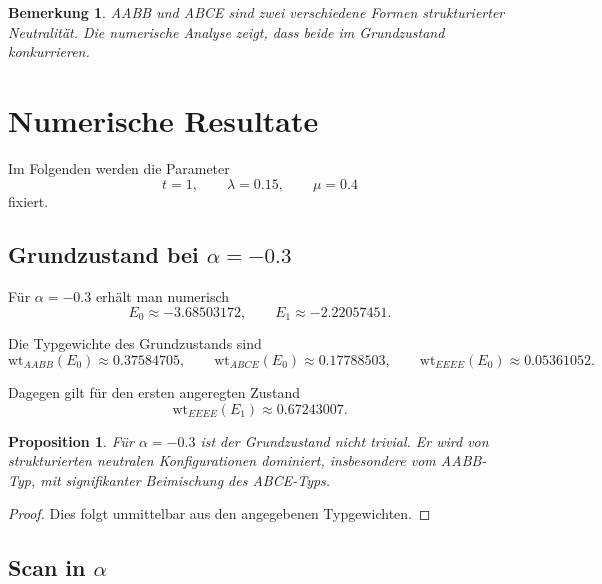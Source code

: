 \documentclass[11pt,a4paper]{article}
\newtheorem{proposition}[definition]{Proposition}
\newtheorem{remark}[definition]{Bemerkung}
\newcommand{\wt}{\mathrm{wt}}
\begin{document}
	\begin{remark}
		AABB und ABCE sind zwei verschiedene Formen strukturierter Neutralität. Die numerische Analyse zeigt, dass beide im Grundzustand konkurrieren.
	\end{remark}
	
	\section{Numerische Resultate}
	
	Im Folgenden werden die Parameter
	\[
	t=1,\qquad \lambda=0.15,\qquad \mu=0.4
	\]
	fixiert.
	
	\subsection{Grundzustand bei \texorpdfstring{$\alpha=-0.3$}{alpha=-0.3}}
	
	Für \(\alpha=-0.3\) erhält man numerisch
	\[
	E_0\approx -3.68503172,\qquad E_1\approx -2.22057451.
	\]
	
	Die Typgewichte des Grundzustands sind
	\[
	\wt_{AABB}(E_0)\approx 0.37584705,\qquad
	\wt_{ABCE}(E_0)\approx 0.17788503,\qquad
	\wt_{EEEE}(E_0)\approx 0.05361052.
	\]
	
	Dagegen gilt für den ersten angeregten Zustand
	\[
	\wt_{EEEE}(E_1)\approx 0.67243007.
	\]
	
	\begin{proposition}
		Für \(\alpha=-0.3\) ist der Grundzustand nicht trivial. Er wird von strukturierten neutralen Konfigurationen dominiert, insbesondere vom AABB-Typ, mit signifikanter Beimischung des ABCE-Typs.
	\end{proposition}
	
	\begin{proof}
		Dies folgt unmittelbar aus den angegebenen Typgewichten.
	\end{proof}
	
	\subsection{Scan in \texorpdfstring{$\alpha$}{alpha}}
	
\end{document}

